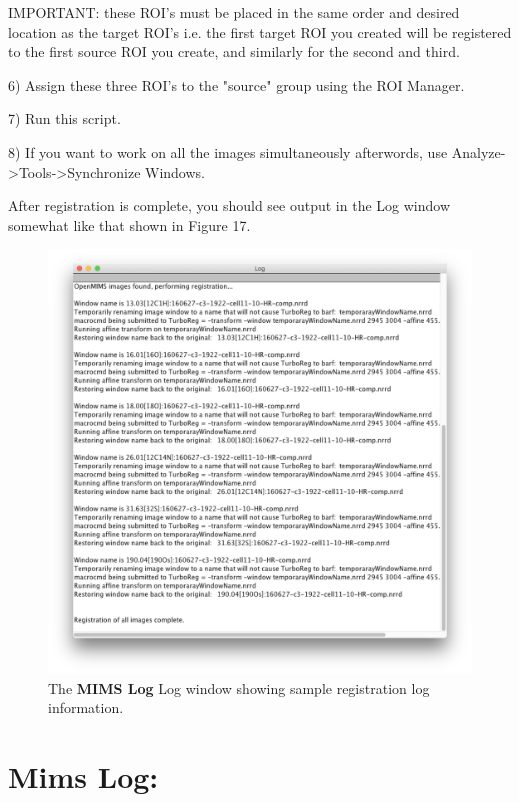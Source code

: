 \documentclass{article}
\begin{document}
IMPORTANT: these ROI's must be placed in the same order and desired location as the target ROI's 
i.e. the first target ROI you created will be registered to the first source ROI you create, and similarly for the second and third.

6) Assign these three ROI's to the "source" group using the ROI Manager.

7) Run this script.

8) If you want to work on all the images simultaneously afterwords, use Analyze->Tools->Synchronize Windows.

	After registration is complete, you should see output in the Log window somewhat like that shown in Figure 17.
	
	\begin{figure}[ht]
	\centering
	\includegraphics[scale=0.70]{snapshotRegistrationResults.png}
	\caption{The \textbf{MIMS Log} Log window showing sample registration log information.}
	\end{figure}
	
	
	
	
	
	
	
\clearpage
\section*{Mims Log:}
	
\end{document}

